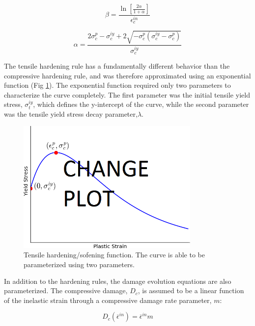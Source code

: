\begin{equation}
\beta=\frac{\ln\left[\frac{2\alpha}{1+\alpha} \right ]}{\epsilon_c^{in}}
\label{eqn:c1}
\end{equation}

\begin{equation}
\alpha =\frac{2\sigma_c^{p}-\sigma_c^{iy}+2\sqrt{-\sigma_c^p\left(\sigma_c^{iy}-\sigma_c^p \right )}}{\sigma_c^{iy}}
\label{eqn:c2}
\end{equation}

The tensile hardening rule has a fundamentally different behavior than the compressive hardening rule, and was therefore approximated using an exponential function (Fig \ref{fig:tensionHardening}). The exponential function required only two parameters to characterize the curve completely. The first parameter was the initial tensile yield stress, $\sigma_{t}^{iy}$, which defines the y-intercept of the curve, while the second parameter was the tensile yield stress decay parameter,$\lambda$.

\begin{figure}[!htb]
\begin{center}
\includegraphics[width=0.8\textwidth]{figures/Chapter3/TensionHardening}
\caption{{\label{fig:tensionHardening} Tensile hardening/sofening function. The curve is able to be parameterized using two parameters.%
}}
\end{center}
\end{figure}

In addition to the hardening rules, the damage evolution equations are also parameterized. The compressive damage, $D_c$, is assumed to be a linear function of the inelastic strain through a compressive damage rate parameter, $m$:

\begin{equation}
D_{c}\left(\bar{\epsilon}^{in}\right)=\bar{\epsilon}^{in}m\label{eqn:param3}
\end{equation}

